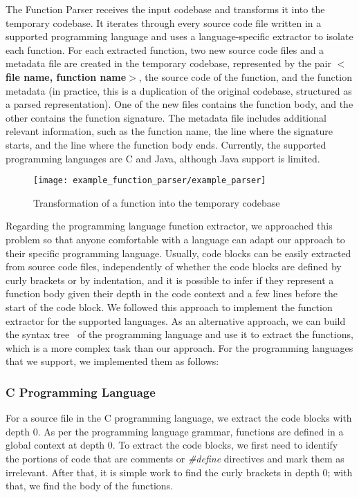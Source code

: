 The Function Parser receives the input codebase and transforms it into the temporary
codebase. It iterates through every source code file written in a supported programming 
language and uses a language-specific extractor to isolate each function. For each extracted 
function, two new source code files and a metadata file are created in the temporary codebase, 
represented by the pair \textbf{$<$file name, function name$>$}, the source code of the function, 
and the function metadata (in practice, this is a duplication of the original codebase, 
structured as a parsed representation). One of the new files contains the function body, and the other 
contains the function signature. The metadata file includes additional relevant information,
such as the function name, the line where the signature starts, and the line where the function 
body ends. Currently, the supported programming languages are C and Java, although Java support is limited.

\begin{figure}
\texttt{[image: example\_function\_parser/example\_parser]}
\caption{Transformation of a function into the temporary codebase}
\label{fig:transform}
\end{figure}

Regarding the programming language function extractor, we approached this problem so that anyone 
comfortable with a language can adapt our approach to their specific programming language. 
Usually, code blocks can be easily extracted from source code files, independently of whether the 
code blocks are defined by curly brackets or by indentation, and it is possible to infer if 
they represent a function body given their depth in the code context and a few lines before the 
start of the code block. We followed this approach to implement the function extractor for the 
supported languages. As an alternative approach, we can build the syntax tree~\citep{compiler} 
of the programming language and use it to extract the functions, which is a more complex task than 
our approach. For the programming languages that we support, we implemented them as follows:

\subsubsection{C Programming Language}

For a source file in the C programming language, we extract the code blocks with depth 0. 
As per the programming language grammar, functions are defined in a global context at depth 0. 
To extract the code blocks, we first need to identify the portions of code that are comments or 
\textit{\#define} directives and mark them as irrelevant. After that, it is simple work to find 
the curly brackets in depth 0; with that, we find the body of the functions.

